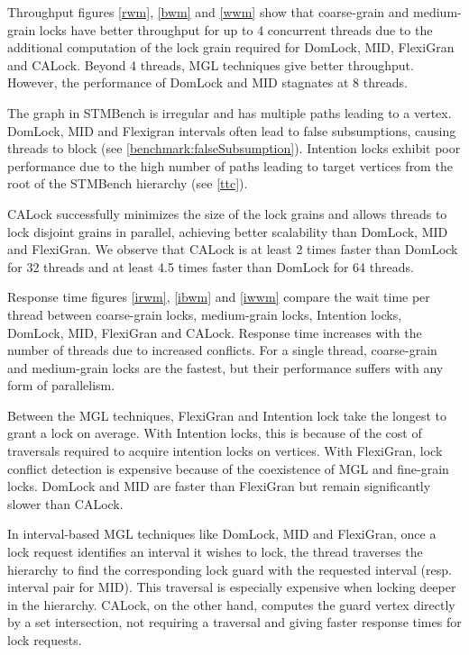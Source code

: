 Throughput figures \cref{rwm}, \cref{bwm} and \cref{wwm} show that coarse-grain and medium-grain locks have better throughput for up to 4 concurrent threads due to the additional computation of the lock grain required for DomLock, MID, FlexiGran and CALock. Beyond 4 threads, MGL techniques give better throughput. However, the performance of DomLock and MID stagnates at 8 threads.

The graph in STMBench is irregular and has multiple paths leading to a vertex. DomLock, MID and Flexigran intervals often lead to false subsumptions, causing threads to block (see \cref{benchmark:falseSubsumption}). Intention locks exhibit poor performance due to the high number of paths leading to target vertices from the root of the STMBench hierarchy (see \cref{ttc}).

CALock successfully minimizes the size of the lock grains and allows threads to lock disjoint grains in parallel, achieving better scalability than DomLock, MID and FlexiGran.
We observe that CALock is at least 2 times faster than DomLock for 32 threads and at least 4.5 times faster than DomLock for 64 threads.


Response time figures \cref{irwm}, \cref{ibwm} and \cref{iwwm} compare the wait time per thread between coarse-grain locks, medium-grain locks, Intention locks,  DomLock, MID, FlexiGran and CALock.
Response time increases with the number of threads due to increased conflicts.
For a single thread, coarse-grain and medium-grain locks are the fastest, but their performance suffers with any form of parallelism. 

Between the MGL techniques, FlexiGran and Intention lock take the longest to grant a lock on average. With Intention locks, this is because of the cost of traversals required to acquire intention locks on vertices. With FlexiGran, lock conflict detection is expensive because of the coexistence of MGL and fine-grain locks. DomLock and MID are faster than FlexiGran but remain significantly slower than CALock. 

In interval-based MGL techniques like DomLock, MID and FlexiGran, once a lock request identifies an interval it wishes to lock, the thread traverses the hierarchy to find the corresponding lock guard with the requested interval (resp. interval pair for MID). This traversal is especially expensive when locking deeper in the hierarchy. CALock, on the other hand, computes the guard vertex directly by a set intersection, not requiring a traversal and giving faster response times for lock requests. 

